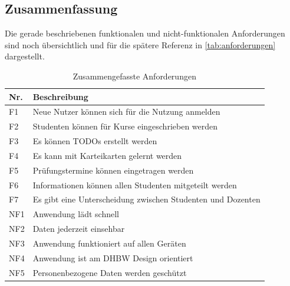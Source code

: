 \subsection{Zusammenfassung}
Die gerade beschriebenen funktionalen und nicht-funktionalen Anforderungen sind noch übersichtlich und für die spätere Referenz in \autoref{tab:anforderungen} dargestellt.


\begin{table}[h]
    \centering
    \begin{tabularx}{.8\textwidth}{l|X}
        Nr.     & Beschreibung                              \\\hline
        F1      & Neue Nutzer können sich für die Nutzung anmelden                    \\
        F2      & Studenten können für Kurse eingeschrieben werden  \\
        F3      & Es können TODOs erstellt werden   \\
        F4      & Es kann mit Karteikarten gelernt werden  \\
        F5      & Prüfungstermine können eingetragen werden  \\
        F6      & Informationen können allen Studenten mitgeteilt werden  \\
        F7      & Es gibt eine Unterscheidung zwischen Studenten und Dozenten  \\
        NF1     & Anwendung lädt schnell                    \\
        NF2     & Daten jederzeit einsehbar                 \\
        NF3     & Anwendung funktioniert auf allen Geräten  \\
        NF4     & Anwendung ist am DHBW Design orientiert   \\
        NF5     & Personenbezogene Daten werden geschützt  \\
    \end{tabularx}
    \caption{Zusammengefasste Anforderungen}
    \label{tab:anforderungen}
\end{table}

